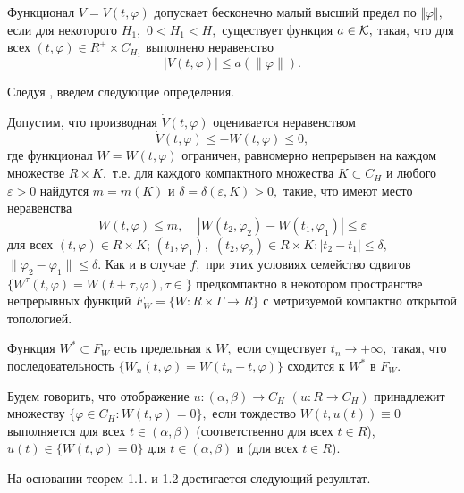 \begin{Def}\label{d2.10} Функционал $V=V(t,\varphi )$ допускает бесконечно
	малый высший предел по $\Vert \varphi \Vert,$ если для некоторого
	$H_1,$ $0<H_1<H,$ существует функция $a\in {\cal K},$ такая, что
	для всех  $(t,\varphi) \in R^+\times C_{H_1}$ выполнено
	неравенство $$ |V(t,\varphi )|\le a(\|\varphi\| ). $$
\end{Def}

Следуя \cite{}, введем следующие определения.

Допустим, что производная $\dot V(t,\varphi )$ оценивается неравенством
\begin{equation}
\dot V(t,\varphi )\le -W(t,\varphi )\le 0, \label{3.3'}
\end{equation}
где функционал $W=W(t,\varphi )$ ограничен, равномерно непрерывен
на каждом множестве $R \times K,$ т.е. для каждого компактного
множества $K\subset C_H$ и любого $\varepsilon >0$ найдутся
$m=m(K)$ и $\delta =\delta (\varepsilon ,K)>0,$ такие, что имеют
место неравенства
\begin{equation}
W(t,\varphi )\le m,\ \ \ \ \ |W(t_2,\varphi _2)-W(t_1,\varphi
_1)|\le\varepsilon \label{3.4'}
\end{equation}
для всех $(t,\varphi )\in R \times K$; $(t_1,\varphi _1),$
$(t_2,\varphi _2)\in R \times K : |t_2-t_1|\le \delta,$
$\|\varphi _2-\varphi _1\|\le\delta.$
Как и в случае $f,$ при этих  условиях семейство сдвигов $\{
W^{\tau }(t,\varphi )=W(t+\tau ,\varphi ), \tau\in \}$
предкомпактно в некотором пространстве непрерывных функций
$F_{W}=\{ W : R\times\Gamma\to R\}$  с метризуемой компактно
открытой топологией.

\begin{Def}\label{d-3.1} Функция $W^*\subset F_W$ есть предельная к $W,$  если
	существует $t_n\to +\infty, $  такая,  что  последовательность $\{
	W_n(t,\varphi )=W(t_n+t,\varphi )\}$ сходится к $W^*$  в $F_{W}.$
\end{Def}

\begin{Def}\label{d-3.2} Будем говорить, что отображение
	$u : (\alpha ,\beta )\to C_{H}$ $(u : R\to C_{H})$ принадлежит
	множеству $\{ \varphi\in C_{H} : W(t,\varphi )=0 \},$ если
	тождество $W(t,u(t))\equiv 0$ выполняется для всех $t\in (\alpha
	,\beta )$ (соответственно для всех $t\in R$), $u(t)\in \{
	W(t,\varphi )=0\}$ для  $t\in (\alpha ,\beta )$ и (для всех $t\in
	R$).
\end{Def}

На основании теорем 1.1. и 1.2 достигается следующий результат.

